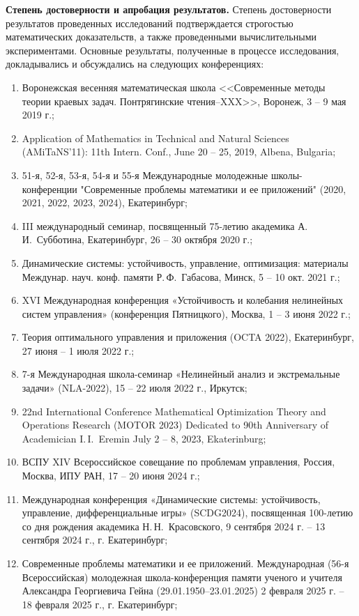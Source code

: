 \textbf{Степень достоверности и апробация результатов.} Степень достоверности результатов проведенных исследований подтверждается строгостью математических доказательств, а также проведенными вычислительными экспериментами.
Основные результаты, полученные в процессе исследования, докладывались и обсуждались на следующих конференциях:
\begin{enumerate}
	\item Воронежская весенняя математическая школа <<Современные методы теории краевых задач. Понтрягинские чтения–XXX>>, Воронеж, 3 -- 9 мая 2019 г.;
	\item Application of Mathematics in Technical and Natural Sciences (AMiTaNS'11): 11th Intern. Conf., June 20 -- 25, 2019, Albena, Bulgaria;
	\item 51-я, 52-я, 53-я, 54-я и 55-я Международные молодежные школы-конференции "Современные проблемы математики и ее приложений" (2020, 2021, 2022, 2023, 2024), Екатеринбург;
	\item III международный семинар, посвященный 75-летию академика А.\,И.~Субботина, Екатеринбург, 26 -- 30 октября 2020 г.;
	\item Динамические системы: устойчивость, управление, оптимизация: материалы Междунар. науч. конф. памяти Р.\,Ф.~Габасова, Минск, 5 -- 10 окт. 2021 г.;
	\item XVI Международная конференция «Устойчивость и колебания нелинейных систем управления» (конференция Пятницкого), Москва, 1 -- 3 июня 2022 г.;
	\item Теория оптимального управления и приложения (OCTA 2022), Екатеринбург, 27 июня -- 1 июля 2022 г.;
	\item 7-я Международная школа-семинар «Нелинейный анализ и экстремальные задачи» (NLA-2022), 15 -- 22 июля 2022 г., Иркутск;
	\item 22nd International Conference Mathematical Optimization Theory and Operations Research (MOTOR 2023) Dedicated to 90th Anniversary of Academician I.\,I.~Eremin July 2 -- 8, 2023, Ekaterinburg;
	\item ВСПУ XIV Всероссийское совещание по проблемам управления, Россия, Москва, ИПУ РАН, 17 -- 20 июня 2024 г.;
	\item Международная конференция «Динамические системы: устойчивость, управление, дифференциальные игры» (SCDG2024), посвященная 100-летию со дня рождения академика Н.\,Н.~Красовского, 9 сентября 2024 г. -- 13 сентября 2024 г., г. Екатеринбург;
	\item Современные проблемы математики и ее приложений. Международная (56-я Всероссийская) молодежная школа-конференция памяти ученого и учителя Александра Георгиевича Гейна (29.01.1950–23.01.2025) 2 февраля 2025 г. -- 18 февраля 2025 г., г. Екатеринбург;
\end{enumerate}

